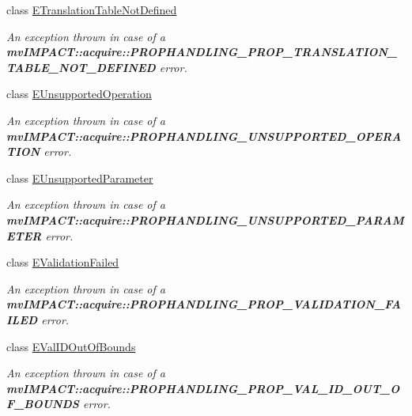 \begin{DoxyCompactItemize}
class \hyperlink{classmv_i_m_p_a_c_t_1_1acquire_1_1_e_translation_table_not_defined}{E\+Translation\+Table\+Not\+Defined}
\begin{DoxyCompactList}\small\item\em An exception thrown in case of a {\bfseries mv\+I\+M\+P\+A\+C\+T\+::acquire\+::\+P\+R\+O\+P\+H\+A\+N\+D\+L\+I\+N\+G\+\_\+\+P\+R\+O\+P\+\_\+\+T\+R\+A\+N\+S\+L\+A\+T\+I\+O\+N\+\_\+\+T\+A\+B\+L\+E\+\_\+\+N\+O\+T\+\_\+\+D\+E\+F\+I\+N\+E\+D} error. \end{DoxyCompactList}\item 
class \hyperlink{classmv_i_m_p_a_c_t_1_1acquire_1_1_e_unsupported_operation}{E\+Unsupported\+Operation}
\begin{DoxyCompactList}\small\item\em An exception thrown in case of a {\bfseries mv\+I\+M\+P\+A\+C\+T\+::acquire\+::\+P\+R\+O\+P\+H\+A\+N\+D\+L\+I\+N\+G\+\_\+\+U\+N\+S\+U\+P\+P\+O\+R\+T\+E\+D\+\_\+\+O\+P\+E\+R\+A\+T\+I\+O\+N} error. \end{DoxyCompactList}\item 
class \hyperlink{classmv_i_m_p_a_c_t_1_1acquire_1_1_e_unsupported_parameter}{E\+Unsupported\+Parameter}
\begin{DoxyCompactList}\small\item\em An exception thrown in case of a {\bfseries mv\+I\+M\+P\+A\+C\+T\+::acquire\+::\+P\+R\+O\+P\+H\+A\+N\+D\+L\+I\+N\+G\+\_\+\+U\+N\+S\+U\+P\+P\+O\+R\+T\+E\+D\+\_\+\+P\+A\+R\+A\+M\+E\+T\+E\+R} error. \end{DoxyCompactList}\item 
class \hyperlink{classmv_i_m_p_a_c_t_1_1acquire_1_1_e_validation_failed}{E\+Validation\+Failed}
\begin{DoxyCompactList}\small\item\em An exception thrown in case of a {\bfseries mv\+I\+M\+P\+A\+C\+T\+::acquire\+::\+P\+R\+O\+P\+H\+A\+N\+D\+L\+I\+N\+G\+\_\+\+P\+R\+O\+P\+\_\+\+V\+A\+L\+I\+D\+A\+T\+I\+O\+N\+\_\+\+F\+A\+I\+L\+E\+D} error. \end{DoxyCompactList}\item 
class \hyperlink{classmv_i_m_p_a_c_t_1_1acquire_1_1_e_val_i_d_out_of_bounds}{E\+Val\+I\+D\+Out\+Of\+Bounds}
\begin{DoxyCompactList}\small\item\em An exception thrown in case of a {\bfseries mv\+I\+M\+P\+A\+C\+T\+::acquire\+::\+P\+R\+O\+P\+H\+A\+N\+D\+L\+I\+N\+G\+\_\+\+P\+R\+O\+P\+\_\+\+V\+A\+L\+\_\+\+I\+D\+\_\+\+O\+U\+T\+\_\+\+O\+F\+\_\+\+B\+O\+U\+N\+D\+S} error. \end{DoxyCompactList}\item 

\end{DoxyCompactItemize}
